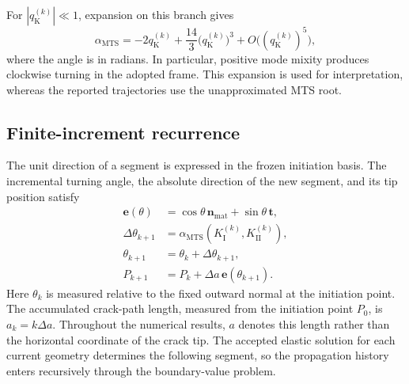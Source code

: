 \documentclass[pdflatex,sn-mathphys-num]{sn-jnl}
\begin{document}
For $|q_{\mathrm{K}}^{(k)}|\ll1$, expansion on this branch gives
\begin{equation}
 \alpha_{\mathrm{MTS}}
 =-2q_{\mathrm{K}}^{(k)}
  +\frac{14}{3}\bigl(q_{\mathrm{K}}^{(k)}\bigr)^3
  +O\bigl((q_{\mathrm{K}}^{(k)})^5\bigr),
 \label{eq:mts-small-mixity}
\end{equation}
where the angle is in radians. In particular, positive mode mixity
produces clockwise turning in the adopted frame. This expansion is
used for interpretation, whereas the reported trajectories use the
unapproximated MTS root.

\subsection{Finite-increment recurrence}
The unit direction of a segment is expressed in the frozen initiation
basis. The incremental turning angle, the absolute direction of the new
segment, and its tip position satisfy
\begin{align}
 \bm e(\theta)&=\cos\theta\,\bm n_{\mathrm{mat}}
                 +\sin\theta\,\bm t,\label{eq:direction}\\
 \Delta\theta_{k+1}
   &=\alpha_{\mathrm{MTS}}(K_{\mathrm{I}}^{(k)},K_{\mathrm{II}}^{(k)}),
     \label{eq:turn}\\
 \theta_{k+1}&=\theta_k+\Delta\theta_{k+1},\label{eq:angleupdate}\\
 P_{k+1}&=P_k+\Delta a\,\bm e(\theta_{k+1}).\label{eq:pointupdate}
\end{align}
Here $\theta_k$ is measured relative to the fixed outward normal at
the initiation point. The accumulated crack-path length, measured from the initiation
point $P_0$, is $a_k=k\Delta a$. Throughout the numerical results,
$a$ denotes this length rather than the horizontal coordinate of the crack tip. The accepted
elastic solution for each current geometry determines the following
segment, so the propagation history enters recursively through the
boundary-value problem.
\end{document}
